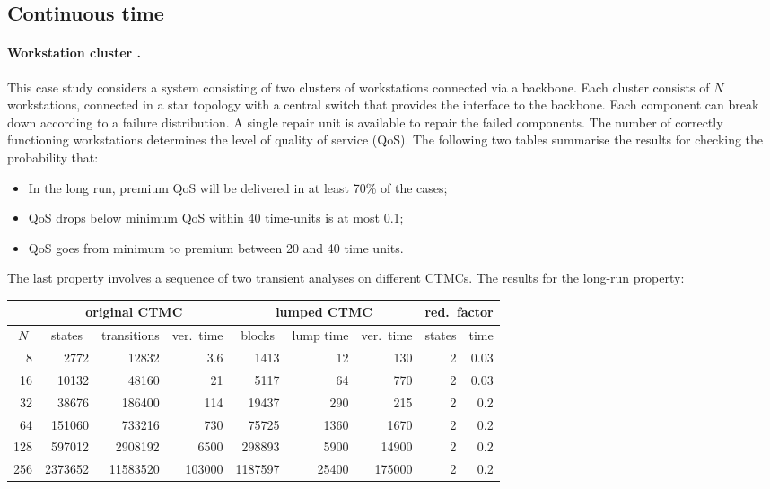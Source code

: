 \documentclass{llncs}
\begin{document}
\subsection{Continuous time}


\paragraph{Workstation cluster \cite{HaverkortHK_SRDS00}.}
This case study considers a system consisting of two clusters of workstations connected
via a backbone.  Each cluster consists of $N$ workstations, connected in a star topology
with a central switch that provides the interface to the backbone.  Each component can 
break down according to a failure distribution.  A single repair unit is available to repair
the failed components.  The number of correctly functioning workstations determines the
level of quality of service (QoS).  
The following two tables summarise the results for checking the probability that:
\begin{itemize}
\item In the long run, premium QoS will be delivered in at least 70\% of the cases;
\item QoS drops below minimum QoS within 40 time-units is at most 0.1;
\item QoS goes from minimum to premium between 20 and 40 time units.
\end{itemize}
The last property involves a sequence of two transient analyses on different CTMCs.
The results for the long-run property:
%
{\scriptsize
\begin{center}
\begin{tabular}{|r|r|r|r|r|r|r|r|r|}
\hline 
  & \multicolumn{3}{c|}{original CTMC} & \multicolumn{3}{c|}{lumped CTMC} 
  & \multicolumn{2}{c|}{red.\ factor} \\[1ex] \hline 
\multicolumn{1}{|c|}{$N$} & \multicolumn{1}{c|}{states} &transitions& ver.\ time      & \multicolumn{1}{c|}{blocks} &lump time&ver.\ time&states&time \\ \hline
  8 &    2772 &    12832 &     3.6          &    1413 &    12 &    130   &  2  & 0.03 \\
 16 &   10132 &    48160 &    21\phantom{.0}&    5117 &    64 &    770   &  2  & 0.03 \\
 32 &   38676 &   186400 &   114\phantom{.0}&   19437 &   290 &    215   &  2  & 0.2\phantom{0} \\
 64 &  151060 &   733216 &   730\phantom{.0}&   75725 &  1360 &   1670   &  2  & 0.2\phantom{0} \\
128 &  597012 &  2908192 &  6500\phantom{.0}&  298893 &  5900 &  14900   &  2  & 0.2\phantom{0} \\
256 & 2373652 & 11583520 &103000\phantom{.0}& 1187597 & 25400 &  175000   &  2  & 0.2\phantom{0} \\ \hline
\end{tabular} \end{center} }
\end{document}
